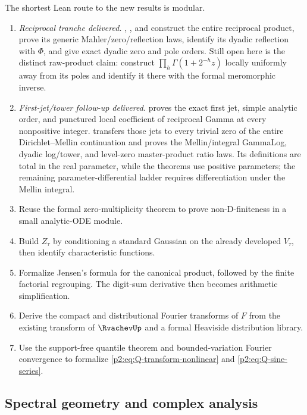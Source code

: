 \documentclass[11pt]{article}
\theoremstyle{definition}
\theoremstyle{remark}
\begin{document}
The shortest Lean route to the new results is modular.
\begin{enumerate}[leftmargin=2.3em]
\item \emph{Reciprocal tranche delivered.}  ,
      , and  construct the
      entire reciprocal product, prove its generic Mahler/zero/reflection laws, identify its
      dyadic reflection with \(\Phi\), and give exact dyadic zero and pole orders.  Still open
      here is the distinct raw-product claim: construct
      \(\prod_h\Gamma(1+2^{-h}z)\) locally uniformly away from its poles and identify it there
      with the formal meromorphic inverse.
\item \emph{First-jet/tower follow-up delivered.}
       proves the exact first jet, simple analytic
      order, and punctured local coefficient of reciprocal Gamma at every
      nonpositive integer.   transfers those jets
      to every trivial zero of the entire Dirichlet--Mellin continuation and
      proves the Mellin/integral GammaLog, dyadic log/tower, and level-zero
      master-product ratio laws.  Its definitions are total in the real
      parameter, while the theorems use positive parameters; the remaining
      parameter-differential ladder requires differentiation under the Mellin
      integral.
\item Reuse the formal zero-multiplicity theorem to prove non-D-finiteness in a small
      analytic-ODE module.
\item Build $Z_\tau$ by conditioning a standard Gaussian on the already developed
      $V_\tau$, then identify characteristic functions.
\item Formalize Jensen's formula for the canonical product, followed by the finite factorial
      regrouping.  The digit-sum derivative then becomes arithmetic simplification.
\item Derive the compact and distributional Fourier transforms of $F$ from the existing
      transform of $\RvachevUp$ and a formal Heaviside distribution library.
\item Use the support-free quantile theorem and bounded-variation Fourier convergence to
      formalize \eqref{p2:eq:Q-transform-nonlinear} and \eqref{p2:eq:Q-sine-series}.
\end{enumerate}

\subsection{Spectral geometry and complex analysis}
\end{document}

